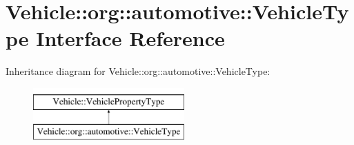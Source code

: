 \hypertarget{interfaceVehicle_1_1org_1_1automotive_1_1VehicleType}{\section{Vehicle\-:\-:org\-:\-:automotive\-:\-:Vehicle\-Type Interface Reference}
\label{interfaceVehicle_1_1org_1_1automotive_1_1VehicleType}
}
Inheritance diagram for Vehicle\-:\-:org\-:\-:automotive\-:\-:Vehicle\-Type\-:\begin{figure}[H]
\begin{center}
\leavevmode
\includegraphics[height=2.000000cm]{interfaceVehicle_1_1org_1_1automotive_1_1VehicleType}
\end{center}
\end{figure}
